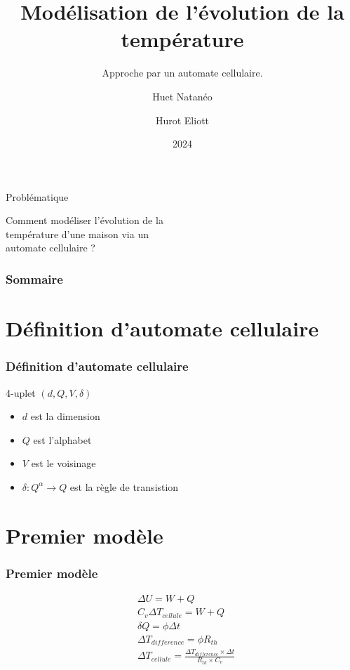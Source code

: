 \documentclass{beamer}
\title{Modélisation de l'évolution de la température}
\subtitle{Approche par un automate cellulaire.}
\author{Huet Natanéo \and Hurot Eliott}
\date{2024}
\begin{document}
\frame{\titlepage}

\begin{frame}{Problématique}
    \begin{center}
        \huge{Comment modéliser l'évolution de la \\ température d'une maison via un \\ automate cellulaire ?}
    \end{center}
\end{frame}

\begin{frame}
    \frametitle{Sommaire}
    \tableofcontents
\end{frame}

\section{Définition d'automate cellulaire}
\begin{frame}
    \frametitle{Définition d'automate cellulaire}

    4-uplet $ ( d, Q, V, \delta ) $ 
    \begin{itemize}
        \item $d$ est la dimension
        \item $Q$ est l'alphabet
        \item $V$ est le voisinage
        \item ${ \delta : Q^{\alpha} \longrightarrow Q }$ est la règle de transistion
    \end{itemize}
\end{frame}

\section{Premier modèle}
\begin{frame}
    \frametitle{Premier modèle}
    \begin{align*}
    & \Delta U = W + Q \\
    & C_v \Delta T_{cellule} = W + Q \\
    & \delta Q = \phi \Delta t \\
    & \Delta T_{difference} = \phi R_{th} \\
    & \Delta T_{cellule} = \frac{\Delta T_{difference} \times \Delta t} {R_{th} \times C_v} 
    \end{align*}
    
\end{frame}
\end{document}
